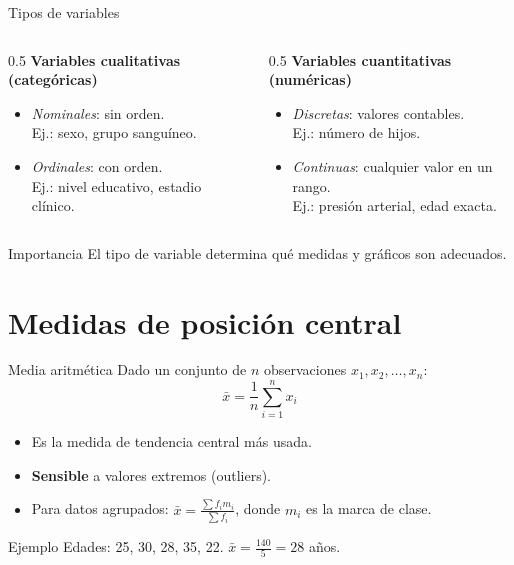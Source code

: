 \documentclass[aspectratio=169]{beamer}
\begin{document}
\begin{frame}{Tipos de variables}
  \begin{columns}
    \begin{column}{0.5\textwidth}
      \textbf{Variables cualitativas (categóricas)}
      \begin{itemize}
        \item \emph{Nominales}: sin orden. \\
          Ej.: sexo, grupo sanguíneo.
        \item \emph{Ordinales}: con orden. \\
          Ej.: nivel educativo, estadio clínico.
      \end{itemize}
    \end{column}
    \begin{column}{0.5\textwidth}
      \textbf{Variables cuantitativas (numéricas)}
      \begin{itemize}
        \item \emph{Discretas}: valores contables. \\
          Ej.: número de hijos.
        \item \emph{Continuas}: cualquier valor en un rango. \\
          Ej.: presión arterial, edad exacta.
      \end{itemize}
    \end{column}
  \end{columns}
  \bigskip
  \begin{block}{Importancia}
    El tipo de variable determina qué medidas y gráficos son adecuados.
  \end{block}
\end{frame}

\section{Medidas de posición central}

\begin{frame}{Media aritmética}
  Dado un conjunto de $n$ observaciones $x_1, x_2, \ldots, x_n$:
  \[
    \bar{x} = \frac{1}{n}\sum_{i=1}^{n} x_i
  \]
  \begin{itemize}
    \item Es la medida de tendencia central más usada.
    \item \textbf{Sensible} a valores extremos (outliers).
    \item Para datos agrupados: $\bar{x} = \frac{\sum f_i m_i}{\sum f_i}$, donde $m_i$ es la marca de clase.
  \end{itemize}
  \bigskip
  \begin{exampleblock}{Ejemplo}
    Edades: 25, 30, 28, 35, 22. \quad $\bar{x} = \frac{140}{5} = 28$ años.
  \end{exampleblock}
\end{frame}
\end{document}
